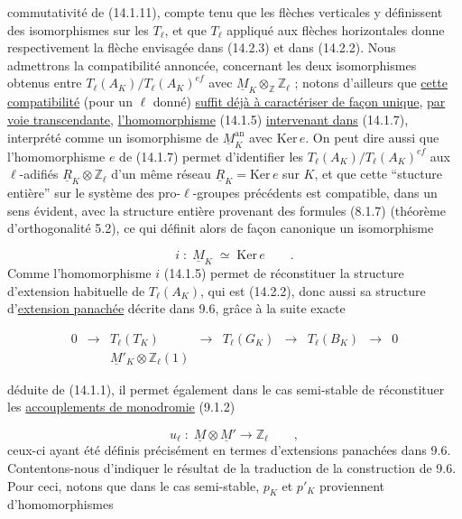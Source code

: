commutativité de (14.1.11), compte tenu que les flèches verticales y définissent des isomorphismes sur les $T_\ell$, et que $T_\ell$ appliqué aux flèches horizontales donne respectivement la flèche envisagée dans (14.2.3) et dans (14.2.2). Nous admettrons la compatibilité annoncée, concernant les deux isomorphismes obtenus entre $T_\ell(A_K)/T_\ell(A_K)^{ef}$ avec $\underline{M}_K \otimes_{\mathbb{Z}} \mathbb{Z}_\ell$ ; notons d'ailleurs que \underline{cette compatibilité} (pour un $\ell$ donné) \underline{suffit déjà à caractériser de façon unique}, \underline{par voie transcendante}, \underline{l'homomorphisme} (14.1.5) \underline{intervenant dans} (14.1.7), interprété comme un isomorphisme de $\underline{M}_K^{\mathrm{an}}$ avec $\mathrm{Ker}\, e$. On peut dire aussi que l'homomorphisme $e$ de (14.1.7) permet d'identifier les $T_\ell(A_K)/T_\ell(A_K)^{ef}$ aux $\ell$-adifiés $\underline{R}_K \otimes \mathbb{Z}_\ell$ d'un même réseau $\underline{R}_K = \mathrm{Ker}\, e$ sur $K$, et que cette ``stucture entière'' sur le système des pro-$\ell$-groupes précédents est compatible, dans un sens évident, avec la structure entière provenant des formules (8.1.7) (théorème d'orthogonalité 5.2), ce qui définit alors de façon canonique un isomorphisme

\begin{equation*}
i \;:\; \underline{M}_K \;\simeq\; \mathrm{Ker}\, e \qquad .
\end{equation*}
Comme l'homomorphisme $i$ (14.1.5) permet de réconstituer la structure d'extension habituelle de $T_\ell(A_K)$, qui est (14.2.2), donc aussi sa structure d'\underline{extension panachée} décrite dans 9.6, grâce à la suite exacte

\begin{equation*}
\begin{array}{ccccccccc}
0 & \longrightarrow & T_\ell(T_K) & \longrightarrow & T_\ell(G_K) & \longrightarrow & T_\ell(B_K) & \longrightarrow & 0 \\[5ex]
 & & \underline{M}'_K \otimes \mathbb{Z}_\ell(1) & & & & & &
\end{array}
\end{equation*}


déduite de (14.1.1), il permet également dans le cas semi-stable de réconstituer les \underline{accouplements de monodromie} (9.1.2)

\begin{equation}\tag{14.2.4}
u_\ell \;:\; \underline{M} \otimes \underline{M}' \longrightarrow \mathbb{Z}_\ell \qquad ,
\end{equation}
ceux-ci ayant été définis précisément en termes d'extensions panachées dans 9.6. Contentons-nous d'indiquer le résultat de la traduction de la construction de 9.6. Pour ceci, notons que dans le cas semi-stable, $p_K$ et $p'_K$ proviennent d'homomorphismes

